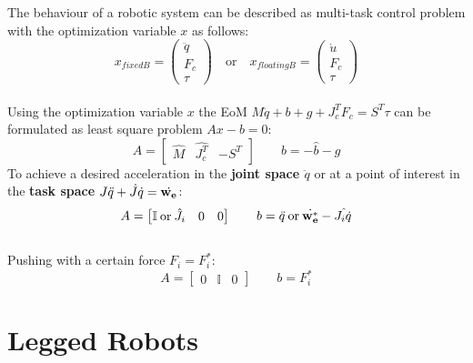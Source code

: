 \documentclass[a4paper, 8pt]{extarticle}
\begin{document}
\begin{multicols*}{3}
The behaviour of a robotic system can be described as multi-task control problem with the optimization variable $x$ as follows:
$$ x_{fixed B}=\begin{pmatrix} \ddot{q} \\ F_{c} \\ \tau \end{pmatrix} \quad \textrm{or} \quad x_{floating B}=\begin{pmatrix} \dot{u} \\ F_{c} \\ \tau \end{pmatrix}$$\\
Using the optimization variable $x$ the EoM \newline $M\ddot{q}+b+g+J_{c}^{T}F_{c}=S^{T}\tau$ can be formulated as least square problem $Ax-b=0$:
$$A=\begin{bmatrix} \hat{M} & \hat{J_{c}^{T}} & -S^{T} \end{bmatrix} \quad \quad b=-\hat{b}-\hat{g}$$
To achieve a desired acceleration in the \textbf{joint space $\ddot{q}$} or at a point of interest in the \textbf{task space $J\ddot{q}+\dot{J}\dot{q}=\dot{\bf w_{e}}$}:
$$ A=\begin{bmatrix} \mathbb{I} \: \textrm{or} \: \hat{J_{i}} & 0 & 0 \end{bmatrix} \quad \quad b=\ddot{q} \: \textrm{or} \: \dot{\bf w_{e}^*}-\hat{J_{i}\dot{q}}$$\\
Pushing with a certain force $F_{i}=F_{i}^*$:
$$A=\begin{bmatrix} 0 & \mathbb{I} & 0 \end{bmatrix} \quad \quad b=F_{i}^*$$

\section{Legged Robots}

\end{multicols*}
\end{document}
